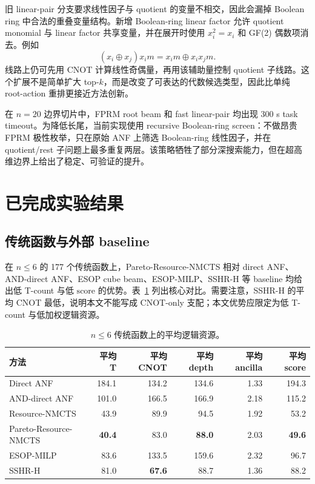 \documentclass[UTF8,fontset=macnew,11pt]{ctexart}
\newcommand{\method}{Resource-NMCTS}
\newcommand{\pareto}{Pareto-Resource-NMCTS}
\newcommand{\score}{\ensuremath{\mathrm{score}}}
\begin{document}
旧 linear-pair 分支要求线性因子与 quotient 的变量不相交，因此会漏掉 Boolean ring 中合法的重叠变量结构。新增 Boolean-ring linear factor 允许 quotient monomial 与 linear factor 共享变量，并在展开时使用 $x_i^2=x_i$ 和 GF(2) 偶数项消去。例如
\begin{equation}
  (x_i\oplus x_j)x_i m = x_i m \oplus x_i x_j m .
  \label{eq:boolean_ring}
\end{equation}
线路上仍可先用 CNOT 计算线性奇偶量，再用该辅助量控制 quotient 子线路。这个扩展不是简单扩大 top-$k$，而是改变了可表达的代数候选类型，因此比单纯 root-action 重排更接近方法创新。

在 $n=20$ 边界切片中，FPRM root beam 和 fast linear-pair 均出现 300 s task timeout。为降低长尾，当前实现使用 recursive Boolean-ring screen：不做昂贵 FPRM 极性枚举，只在原始 ANF 上筛选 Boolean-ring 线性因子，并在 quotient/rest 子问题上最多重复两层。该策略牺牲了部分深搜索能力，但在超高维边界上给出了稳定、可验证的提升。

\section{已完成实验结果}

\subsection{传统函数与外部 baseline}

在 $n\leq6$ 的 177 个传统函数上，\pareto{} 相对 direct ANF、AND-direct ANF、ESOP cube beam、ESOP-MILP、SSHR-H 等 baseline 均给出低 T-count 与低 \score{} 的优势。表~\ref{tab:traditional} 列出核心对比。需要注意，SSHR-H 的平均 CNOT 最低，说明本文不能写成 CNOT-only 支配；本文优势应限定为低 T-count 与低加权逻辑资源。

\begin{table}[t]
\centering
\small
\caption{$n\leq6$ 传统函数上的平均逻辑资源。}
\label{tab:traditional}
\begin{tabular}{lrrrrr}
\toprule
方法 & 平均 T & 平均 CNOT & 平均 depth & 平均 ancilla & 平均 score \\
\midrule
Direct ANF & 184.1 & 134.2 & 134.6 & 1.33 & 194.3 \\
AND-direct ANF & 101.0 & 166.5 & 166.9 & 2.18 & 115.2 \\
\method{} & 43.9 & 89.9 & 94.5 & 1.92 & 53.2 \\
\pareto{} & \textbf{40.4} & 83.0 & \textbf{88.0} & 2.03 & \textbf{49.6} \\
ESOP-MILP & 83.6 & 133.5 & 159.6 & 2.32 & 96.7 \\
SSHR-H & 81.0 & \textbf{67.6} & 88.7 & 1.36 & 88.2 \\
\bottomrule
\end{tabular}
\end{table}
\end{document}
